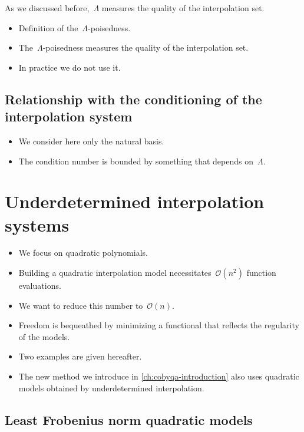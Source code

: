 As we discussed before,~$\Lambda$ measures the quality of the interpolation set.

\begin{itemize}
    \item Definition of the~$\Lambda$-poisedness.
    \item The~$\Lambda$-poisedness measures the quality of the interpolation set.
    \item In practice we do not use it.
\end{itemize}

\subsection{Relationship with the conditioning of the interpolation system}

\begin{itemize}
    \item We consider here only the natural basis.
    \item The condition number is bounded by something that depends on~$\Lambda$.
\end{itemize}

\section{Underdetermined interpolation systems}
\label{sec:underdetermined-interpolation}

\begin{itemize}
    \item We focus on quadratic polynomials.
    \item Building a quadratic interpolation model necessitates~$\mathcal{O}(n^2)$ function evaluations.
    \item We want to reduce this number to~$\mathcal{O}(n)$.
    \item Freedom is bequeathed by minimizing a functional that reflects the regularity of the models.
    \item Two examples are given hereafter.
    \item The new method we introduce in \cref{ch:cobyqa-introduction} also uses quadratic models obtained by underdetermined interpolation.
\end{itemize}

\subsection{Least Frobenius norm quadratic models}

